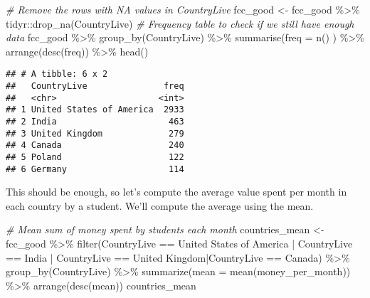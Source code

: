 \documentclass[
]{article}
\newenvironment{Shaded}{\begin{snugshade}}{\end{snugshade}}
\newcommand{\AttributeTok}[1]{\textcolor[rgb]{0.77,0.63,0.00}{#1}}
\newcommand{\CommentTok}[1]{\textcolor[rgb]{0.56,0.35,0.01}{\textit{#1}}}
\newcommand{\FunctionTok}[1]{\textcolor[rgb]{0.00,0.00,0.00}{#1}}
\newcommand{\NormalTok}[1]{#1}
\newcommand{\OtherTok}[1]{\textcolor[rgb]{0.56,0.35,0.01}{#1}}
\newcommand{\SpecialCharTok}[1]{\textcolor[rgb]{0.00,0.00,0.00}{#1}}
\newcommand{\StringTok}[1]{\textcolor[rgb]{0.31,0.60,0.02}{#1}}
\begin{document}
\begin{Shaded}
\begin{Highlighting}[]
\CommentTok{\# Remove the rows with NA values in \textquotesingle{}CountryLive\textquotesingle{}}
\NormalTok{fcc\_good  }\OtherTok{\textless{}{-}}\NormalTok{  fcc\_good }\SpecialCharTok{\%\textgreater{}\%}\NormalTok{ tidyr}\SpecialCharTok{::}\FunctionTok{drop\_na}\NormalTok{(CountryLive)}
\CommentTok{\# Frequency table to check if we still have enough data}
\NormalTok{fcc\_good }\SpecialCharTok{\%\textgreater{}\%} \FunctionTok{group\_by}\NormalTok{(CountryLive) }\SpecialCharTok{\%\textgreater{}\%}
  \FunctionTok{summarise}\NormalTok{(}\AttributeTok{freq =} \FunctionTok{n}\NormalTok{() ) }\SpecialCharTok{\%\textgreater{}\%}
  \FunctionTok{arrange}\NormalTok{(}\FunctionTok{desc}\NormalTok{(freq)) }\SpecialCharTok{\%\textgreater{}\%}
  \FunctionTok{head}\NormalTok{()}
\end{Highlighting}
\end{Shaded}

\begin{verbatim}
## # A tibble: 6 x 2
##   CountryLive               freq
##   <chr>                    <int>
## 1 United States of America  2933
## 2 India                      463
## 3 United Kingdom             279
## 4 Canada                     240
## 5 Poland                     122
## 6 Germany                    114
\end{verbatim}

This should be enough, so let's compute the average value spent per
month in each country by a student. We'll compute the average using the
mean.

\begin{Shaded}
\begin{Highlighting}[]
\CommentTok{\# Mean sum of money spent by students each month}
\NormalTok{countries\_mean  }\OtherTok{\textless{}{-}}\NormalTok{  fcc\_good }\SpecialCharTok{\%\textgreater{}\%} 
  \FunctionTok{filter}\NormalTok{(CountryLive }\SpecialCharTok{==} \StringTok{\textquotesingle{}United States of America\textquotesingle{}} \SpecialCharTok{|}\NormalTok{ CountryLive }\SpecialCharTok{==} \StringTok{\textquotesingle{}India\textquotesingle{}} \SpecialCharTok{|}\NormalTok{ CountryLive }\SpecialCharTok{==} \StringTok{\textquotesingle{}United Kingdom\textquotesingle{}}\SpecialCharTok{|}\NormalTok{CountryLive }\SpecialCharTok{==} \StringTok{\textquotesingle{}Canada\textquotesingle{}}\NormalTok{) }\SpecialCharTok{\%\textgreater{}\%}
  \FunctionTok{group\_by}\NormalTok{(CountryLive) }\SpecialCharTok{\%\textgreater{}\%}
  \FunctionTok{summarize}\NormalTok{(}\AttributeTok{mean =} \FunctionTok{mean}\NormalTok{(money\_per\_month)) }\SpecialCharTok{\%\textgreater{}\%}
  \FunctionTok{arrange}\NormalTok{(}\FunctionTok{desc}\NormalTok{(mean))}
\NormalTok{countries\_mean}
\end{Highlighting}
\end{Shaded}
\end{document}
